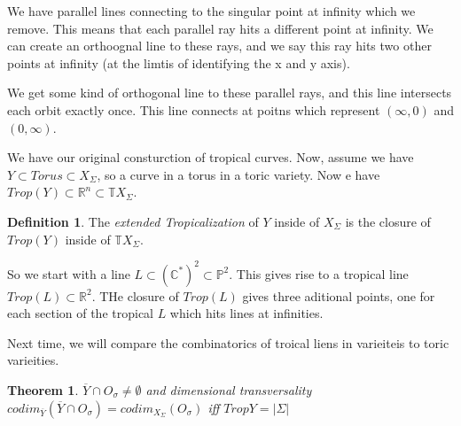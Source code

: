 \documentclass[11pt]{article}
\newtheorem{prototheorem}{Theorem}[section]
\newenvironment{theorem}
   {\begin{prototheorem}}
   {\end{prototheorem}}
\theoremstyle{definition}
\newtheorem{protodefinition}{Definition}[section]
\newenvironment{define}
   {\begin{protodefinition}}
   {\end{protodefinition}}
\def\RR{{\mathbb R}}
\def\CC{{\mathbb C}}
\def\TT{{\mathbb T}}
\def\PP{{\mathbb P}}
\begin{document}
We have parallel lines connecting to the singular point at infinity which we remove. This means that each parallel ray hits a different point at infinity. We can create an orthoognal line to these rays, and we say this ray hits two other points at infinity (at the limtis of identifying the x and y axis).



We get some kind of orthogonal line to these parallel rays, and this line intersects each orbit exactly once. This line connects at poitns which represent $(\infty,0)$ and $(0, \infty)$. 


We have our original consturction of tropical curves. Now, assume we have $Y \subset Torus \subset X_\Sigma$, so a curve in a torus in a toric variety. Now e have $Trop(Y) \subset \RR^n \subset \TT X_\Sigma$. 

\begin{define}
    The \emph{extended Tropicalization} of $Y$ inside of $X_\Sigma$ is the closure of $Trop(Y)$ inside of $\TT X_\Sigma$.
\end{define}


So we start with a line $L \subset (\CC^*)^2 \subset \PP^2$. This gives rise to a tropical line $Trop(L) \subset \RR^2$. THe closure of $Trop(L)$ gives three aditional points, one for each section of the tropical $L$ which hits lines at infinities. 


Next time, we will compare the combinatorics of troical liens in varieiteis to toric varieities. 





\begin{theorem}
     $\overline{Y} \cap O_\sigma \neq \emptyset$ and dimensional transversality $codim_{\overline{Y}}(\overline{Y} \cap O_\sigma) = codim_{X_\Sigma}(O_\sigma)$ iff $Trop Y= |\Sigma|$
\end{theorem}
\end{document}

